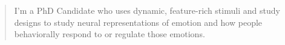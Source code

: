     \begin{quote}
        {\small I'm a PhD Candidate who uses dynamic, feature-rich stimuli and study designs to study neural representations of emotion and how people behaviorally respond to or regulate those emotions.}
    \end{quote}